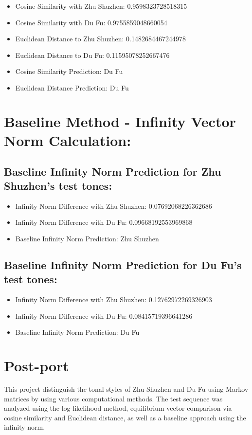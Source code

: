 \documentclass[12pt]{article}
\begin{document}
\begin{itemize}
    \item Cosine Similarity with Zhu Shuzhen: 0.9598323728518315
    \item Cosine Similarity with Du Fu: 0.9755859048660054
    \item Euclidean Distance to Zhu Shuzhen: 0.1482684467244978
    \item Euclidean Distance to Du Fu: 0.11595078252667476
    \item Cosine Similarity Prediction: Du Fu
    \item Euclidean Distance Prediction: Du Fu
\end{itemize}

\section*{Baseline Method - Infinity Vector Norm Calculation: }

\subsection*{Baseline Infinity Norm Prediction for Zhu Shuzhen's test tones:}

\begin{itemize}
    \item Infinity Norm Difference with Zhu Shuzhen: 0.07692068226362686
    \item Infinity Norm Difference with Du Fu: 0.09668192553969868
    \item Baseline Infinity Norm Prediction: Zhu Shuzhen
\end{itemize}

\subsection*{Baseline Infinity Norm Prediction for Du Fu's test tones:}


\begin{itemize}
    \item Infinity Norm Difference with Zhu Shuzhen: 0.12762972269326903
    \item Infinity Norm Difference with Du Fu: 0.08415719396641286
    \item Baseline Infinity Norm Prediction: Du Fu
\end{itemize}

\newpage

\section{Post-port}
This project distinguish the tonal styles of Zhu Shuzhen and Du Fu using Markov matrices by using various computational methods. The test sequence was analyzed using the log-likelihood method, equilibrium vector comparison via cosine similarity and Euclidean distance, as well as a baseline approach using the infinity norm.
\end{document}
